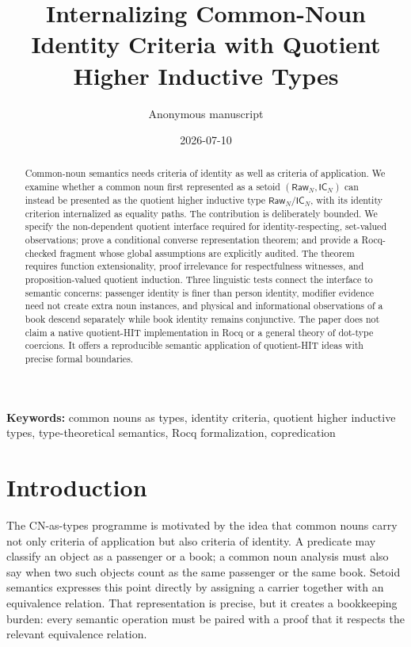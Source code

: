\documentclass[11pt]{article}
\title{Internalizing Common-Noun Identity Criteria with Quotient Higher Inductive Types}
\author{Anonymous manuscript}
\date{2026-07-10}
\newcommand{\Raw}{\mathsf{Raw}}
\newcommand{\IC}{\mathsf{IC}}
\newcommand{\Quot}[2]{#1/{#2}}
\newcommand{\keywords}[1]{\par\medskip\noindent\textbf{Keywords:} #1}
\begin{document}
\maketitle

\begin{abstract}
Common-noun semantics needs criteria of identity as well as criteria of
application.  We examine whether a common noun first represented as a setoid
$(\Raw_N,\IC_N)$ can instead be presented as the quotient higher inductive type
$\Quot{\Raw_N}{\IC_N}$, with its identity criterion internalized as equality
paths.  The contribution is deliberately bounded.  We specify the
non-dependent quotient interface required for identity-respecting,
set-valued observations; prove a conditional converse representation theorem;
and provide a Rocq-checked fragment whose global assumptions are explicitly
audited.  The theorem requires function extensionality, proof irrelevance for
respectfulness witnesses, and proposition-valued quotient induction.  Three
linguistic tests connect the interface to semantic concerns: passenger identity
is finer than person identity, modifier evidence need not create extra noun
instances, and physical and informational observations of a book descend
separately while book identity remains conjunctive.  The paper does not claim a
native quotient-HIT implementation in Rocq or a general theory of dot-type
coercions.  It offers a reproducible semantic application of quotient-HIT
ideas with precise formal boundaries.
\end{abstract}

\keywords{common nouns as types, identity criteria, quotient higher inductive types, type-theoretical semantics, Rocq formalization, copredication}

\section{Introduction}

The CN-as-types programme is motivated by the idea that common nouns carry not
only criteria of application but also criteria of identity.  A predicate may
classify an object as a passenger or a book; a common noun analysis must also
say when two such objects count as the same passenger or the same book.  Setoid
semantics expresses this point directly by assigning a carrier together with
an equivalence relation.  That representation is precise, but it creates a
bookkeeping burden: every semantic operation must be paired with a proof that
it respects the relevant equivalence relation.
\end{document}
